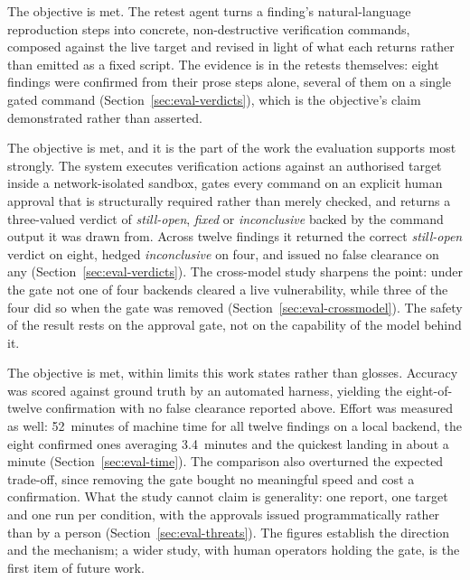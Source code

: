  The objective is met.
The retest agent turns a finding's natural-language reproduction steps into concrete,
non-destructive verification commands, composed against the live target and revised in
light of what each returns rather than emitted as a fixed script. The evidence is in the
retests themselves: eight findings were confirmed from their prose steps alone, several
of them on a single gated command (Section~\ref{sec:eval-verdicts}), which is the
objective's claim demonstrated rather than asserted.

 The objective is met,
and it is the part of the work the evaluation supports most strongly. The system executes
verification actions against an authorised target inside a network-isolated sandbox, gates
every command on an explicit human approval that is structurally required rather than
merely checked, and returns a three-valued verdict of \emph{still-open}, \emph{fixed} or
\emph{inconclusive} backed by the command output it was drawn from. Across twelve findings
it returned the correct \emph{still-open} verdict on eight, hedged \emph{inconclusive} on
four, and issued no false clearance on any (Section~\ref{sec:eval-verdicts}). The
cross-model study sharpens the point: under the gate not one of four backends cleared a
live vulnerability, while three of the four did so when the gate was removed
(Section~\ref{sec:eval-crossmodel}). The safety of the result rests on the approval gate,
not on the capability of the model behind it.

 The objective is met, within
limits this work states rather than glosses. Accuracy was scored against ground truth by an
automated harness, yielding the eight-of-twelve confirmation with no false clearance
reported above. Effort was measured as well: 52~minutes of machine time for all twelve
findings on a local backend, the eight confirmed ones averaging 3.4~minutes and the
quickest landing in about a minute (Section~\ref{sec:eval-time}). The comparison also
overturned the expected trade-off, since removing the gate bought no meaningful speed and
cost a confirmation. What the study cannot claim is generality: one report, one target and
one run per condition, with the approvals issued programmatically rather than by a person
(Section~\ref{sec:eval-threats}). The figures establish the direction and the mechanism;
a wider study, with human operators holding the gate, is the first item of future work.

